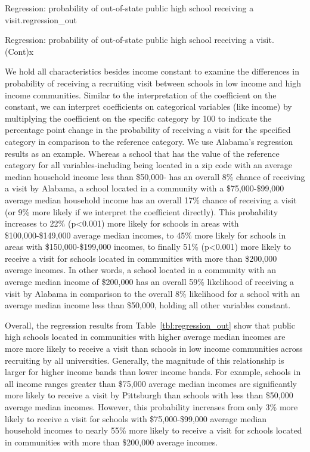 \documentclass[twoside]{article}
\begin{document}
\begin{lscape-env}[8]{Regression: probability of out-of-state public high school receiving a visit.}{regression_out}
  
\end{lscape-env}

 \begin{lscape-env}[8]{Regression: probability of out-of-state public high school receiving a visit. (Cont)}{x}
  
\end{lscape-env}

We hold all characteristics besides income constant to examine the differences in probability of receiving a recruiting visit between schools in low income and high income communities. Similar to the interpretation of the coefficient on the constant, we can interpret coefficients on categorical variables (like income) by multiplying the coefficient on the specific category by 100 to indicate the percentage point change in the probability of receiving a visit for the specified category in comparison to the reference category. We use Alabama's regression results as an example. Whereas a school that has the value of the reference category for all variables-including being located in a zip code with an average median household income less than \$50,000- has an overall 8\% chance of receiving a visit by Alabama, a school located in a community with a \$75,000-\$99,000 average median household income has an overall 17\% chance of receiving a visit (or 9\% more likely if we interpret the coefficient directly).  This probability increases to 22\%  (p<0.001) more likely for schools in areas with \$100,000-\$149,000 average median incomes, to 45\% more likely for schools in areas with \$150,000-\$199,000 incomes, to finally 51\% (p<0.001) more likely to receive a visit for schools located in communities with more than \$200,000 average incomes. In other words, a school located in a community with an average median income of \$200,000 has an overall 59\% likelihood of receiving a visit by Alabama in comparison to the overall 8\% likelihood for a school with an average median income less than \$50,000, holding all other variables constant.

Overall, the regression results from Table~\ref{tbl:regression_out} show that public high schools located in communities with higher average median incomes are more more likely to receive a visit than schools in low income communities across recruiting by all universities. Generally, the magnitude of this relationship is larger for higher income bands than lower income bands. For example, schools in all income ranges greater than \$75,000 average median incomes are significantly more likely to receive a visit by Pittsburgh than schools with less than \$50,000 average median incomes. However, this probability increases from only 3\% more likely to receive a visit for schools with \$75,000-\$99,000 average median household incomes to nearly 55\% more likely to receive a visit for schools located in communities with more than \$200,000 average incomes.
\end{document}
